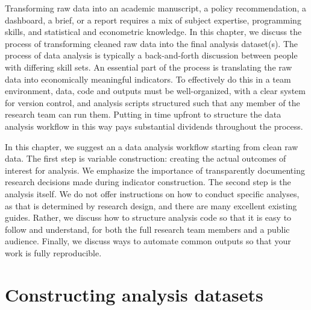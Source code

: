 
\begin{fullwidth}


Transforming raw data into an academic manuscript,
a policy recommendation, a dashboard, a brief, or a report
requires a mix of subject expertise, programming skills,
and statistical and econometric knowledge.
In this chapter, we discuss the process of transforming
cleaned raw data into the final analysis dataset(s).
The process of data analysis is typically
a back-and-forth discussion between people
with differing skill sets.
An essential part of the process is translating the
raw data into economically meaningful indicators.
To effectively do this in a team environment,
data, code and outputs must be well-organized,
with a clear system for version control,
and analysis scripts structured such that any member of the research team can run them.
Putting in time upfront to structure the data analysis workflow
in this way pays substantial dividends throughout the process.

In this chapter, we suggest an a data analysis workflow
starting from clean raw data.
The first step is variable construction:
creating the actual outcomes of interest for analysis.
We emphasize the importance of transparently documenting research decisions
made during indicator construction.
The second step is the analysis itself.
We do not offer instructions on how to conduct specific analyses,
as that is determined by research design,
and there are many excellent existing guides.
Rather, we discuss how to structure analysis code
so that it is easy to follow and understand,
for both the full research team members and a public audience.
Finally, we discuss ways to automate common outputs
so that your work is fully reproducible.

\end{fullwidth}


\section{Constructing analysis datasets}

